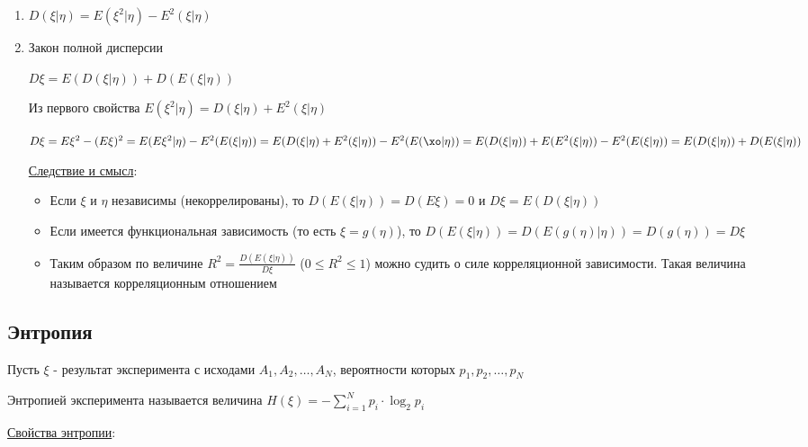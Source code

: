 \documentclass[12pt]{article}
\begin{document}
\begin{enumerate}
    \item $D(\xi | \eta) = E(\xi^2 | \eta) - E^2(\xi | \eta)$

    \item Закон полной дисперсии

    \begin{MyTheorem}
        \Ths $D\xi = E(D(\xi | \eta)) + D(E(\xi | \eta))$
    \end{MyTheorem}

    \begin{MyProof}
        Из первого свойства $E(\xi^2 | \eta) = D(\xi | \eta) + E^2(\xi | \eta)$

        $D\xi = E\xi^2 - (E\xi)^2 = E(E\xi^2 | \eta) - E^2(E(\xi | \eta)) = E(D(\xi | \eta) + E^2(\xi | \eta)) - E^2(E(\xo | \eta)) = E(D(\xi | \eta)) + E(E^2(\xi | \eta)) - E^2(E(\xi | \eta)) = E(D(\xi | \eta)) + D(E(\xi | \eta))$
    \end{MyProof}

    \underline{Следствие и смысл}: 
    
    \begin{itemize}
        \item Если $\xi$ и $\eta$ независимы (некоррелированы), то $D(E(\xi | \eta)) = D(E\xi) = 0$ и $D\xi = E(D(\xi | \eta))$

        \item Если имеется функциональная зависимость (то есть $\xi = g(\eta)$), то $D(E(\xi | \eta)) = D(E(g(\eta) | \eta)) = 
        D(g(\eta)) = D\xi$

        \item Таким образом по величине $R^2 = \frac{D(E(\xi | \eta))}{D\xi}$ ($0 \leq R^2 \leq 1$) можно судить о силе корреляционной зависимости.
        Такая величина называется корреляционным отношением
    \end{itemize}
\end{enumerate}

\subsection{Энтропия}

Пусть $\xi$ - результат эксперимента с исходами $A_1, A_2, \dots, A_N$, вероятности которых $p_1, p_2, \dots, p_N$

\Def Энтропией эксперимента называется величина $H(\xi) = -\sum_{i = 1}^N p_i \cdot \log_2 p_i$

\underline{Свойства энтропии}:
\end{document}

